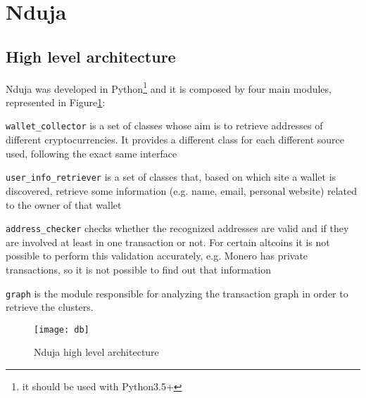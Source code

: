 \newcommand{\walletcollector}{\texttt{wallet\_collector}}
\newcommand{\userinforetriever}{\texttt{user\_info\_retriever}}
\newcommand{\addresschecker}{\texttt{address\_checker}}
\newcommand{\graph}{\texttt{graph}}

\section{Nduja} \label{nduja}
\subsection{High level architecture}
Nduja was developed in Python\footnote{it should be used with Python3.5+} and it
is composed by four main modules, represented in Figure\ref{fig:architecture}:
\begin{enumerate*}[label=\roman*),itemjoin={,\quad}]
\item \walletcollector{} is a set of classes whose aim is to retrieve
addresses of different cryptocurrencies. It provides a different class for each
different source used, following the exact same interface
\item \userinforetriever{} is a set of classes that, based on which
site a wallet is discovered, retrieve some information (e.g. name, email,
personal website) related to the owner of that wallet
\item \addresschecker{} checks whether the recognized addresses are valid and if
they are involved at least in one transaction or not. For certain
altcoins it is not possible to perform this validation accurately, e.g.
Monero has private transactions, so it is not possible to find out that
information
\item \graph{} is the module responsible for analyzing the transaction graph
in order to retrieve the clusters.
\end{enumerate*}

\begin{figure}[t]
\centering
\texttt{[image: db]}
\caption{Nduja high level architecture}
\label{fig:architecture}
\end{figure}

